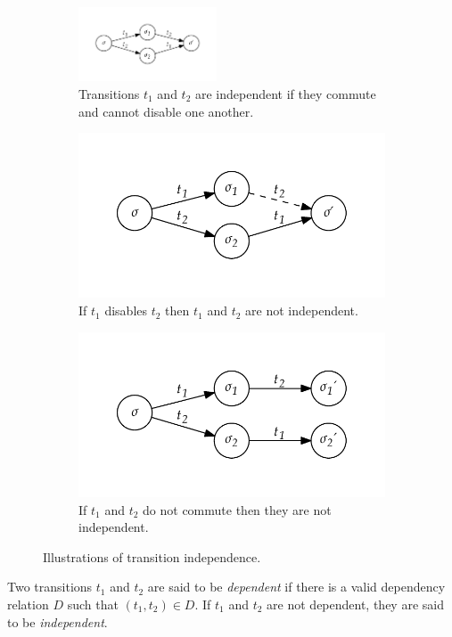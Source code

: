 \documentclass[12pt,a4paper,twoside,openright]{report}
\begin{document}
\begin{figure}[h]
	\centering
	\begin{subfigure}{\textwidth}
		\centering
		\includegraphics*[width=0.45\textwidth]{independence1}
		\caption{Transitions $t_1$ and $t_2$ are independent if
			they commute and cannot disable one another.}
	\end{subfigure}
	\begin{subfigure}{.45\textwidth}
		\centering
		\includegraphics*[width=\textwidth]{independence2}
		\caption{If $t_1$ disables $t_2$ then $t_1$ and $t_2$
			are not independent.}
	\end{subfigure}
	\quad
	\begin{subfigure}{.45\textwidth}
		\centering
		\includegraphics*[width=\textwidth]{independence3}
		\caption{If $t_1$ and $t_2$ do not commute then they
			are not independent.}
	\end{subfigure}
	\caption{Illustrations of transition independence.}
	\label{fig:independence}
\end{figure}
Two transitions $t_1$ and $t_2$ are said to be \emph{dependent}
if there is a valid dependency relation $D$ such that $(t_1, t_2) \in D$.
If $t_1$ and $t_2$ are not dependent, they are said to be \emph{independent}.
\end{document}
